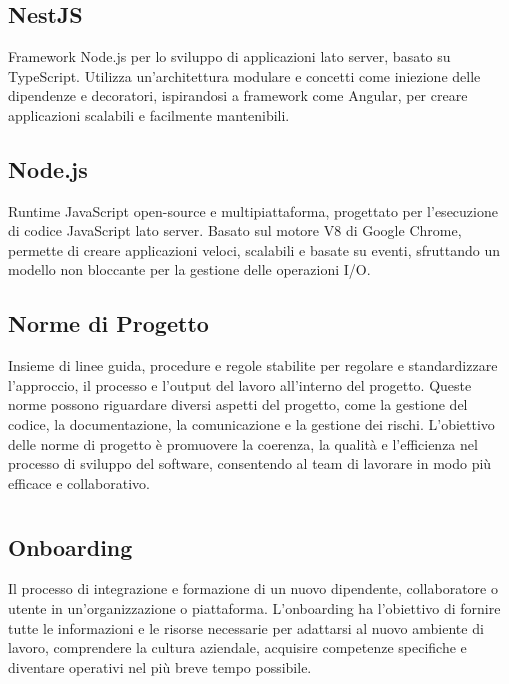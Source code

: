 \section{}

\hypertarget{sec:nestjs}{}
\subsection*{NestJS}
Framework Node.js per lo sviluppo di applicazioni lato server, basato su TypeScript. Utilizza un'architettura modulare e concetti come iniezione delle 
dipendenze e decoratori, ispirandosi a framework come Angular, per creare applicazioni scalabili e facilmente mantenibili.

\hypertarget{sec:nodejs}{}
\subsection*{Node.js}
Runtime JavaScript open-source e multipiattaforma, progettato per l'esecuzione di codice JavaScript lato server. Basato sul motore V8 di Google Chrome, 
permette di creare applicazioni veloci, scalabili e basate su eventi, sfruttando un modello non bloccante per la gestione delle operazioni I/O.

\subsection*{Norme di Progetto}
Insieme di linee guida, procedure e regole stabilite per regolare e standardizzare l’approccio, il processo e l’output del lavoro all’interno del progetto. 
Queste norme possono riguardare diversi aspetti del progetto, come la gestione del codice, la documentazione, la comunicazione e la gestione dei rischi. 
L’obiettivo delle norme di progetto è promuovere la coerenza, la qualità e l’efficienza nel processo di sviluppo del software, consentendo al team di 
lavorare in modo più efficace e collaborativo.

\newpage



\section{}

\hypertarget{sec:onboarding}{}
\subsection*{Onboarding}
Il processo di integrazione e formazione di un nuovo dipendente, collaboratore o utente in un'organizzazione o piattaforma. L'onboarding ha l'obiettivo di 
fornire tutte le informazioni e le risorse necessarie per adattarsi al nuovo ambiente di lavoro, comprendere la cultura aziendale, acquisire competenze 
specifiche e diventare operativi nel più breve tempo possibile. 


\newpage